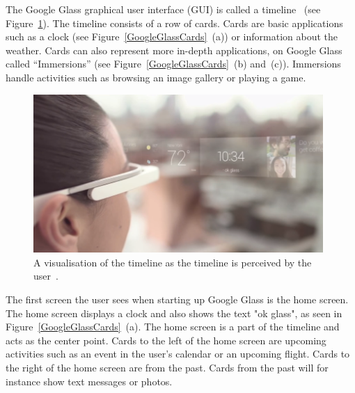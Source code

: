 The Google Glass graphical user interface (GUI) is called a timeline~\cite{ImagesGoogleGlassUI} (see Figure~\ref{GoogleGlassUI}). The timeline consists of a row of cards. Cards are basic applications such as a clock (see Figure~\ref{GoogleGlassCards}~(a)) or information about the weather. Cards can also represent more in-depth applications, on Google Glass called ``Immersions'' (see Figure~\ref{GoogleGlassCards}~(b) and~(c)). Immersions handle activities such as browsing an image gallery or playing a game.

	\begin{figure}[ht!]
		\centering
		\includegraphics[width=110mm]{images/GoogleGlassUI}
		\caption{A visualisation of the timeline as the timeline is perceived by the user~\cite{ImagesGoogleGlassUI}.}
		\label{GoogleGlassUI}
	\end{figure}

The first screen the user sees when starting up Google Glass is the home screen. The home screen displays a clock and also shows the text "ok glass", as seen in Figure~\ref{GoogleGlassCards}~(a). The home screen is a part of the timeline and acts as the center point. Cards to the left of the home screen are upcoming activities such as an event in the user's calendar or an upcoming flight. Cards to the right of the home screen are from the past. Cards from the past will for instance show text messages or photos.


